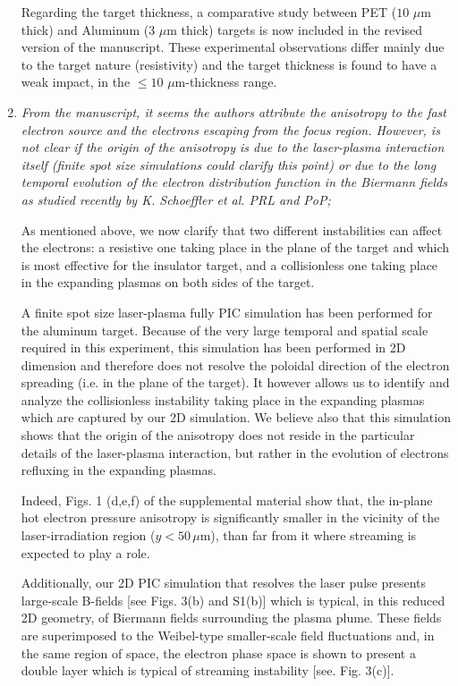 \documentclass[aps,showpacs,superscriptaddress]{revtex4}%
\begin{document}
\begin{enumerate}
Regarding the target thickness, a comparative study between PET ($10$ $\mu$m thick) and Aluminum  (3 $\mu$m thick)  targets is now included in the revised version of the manuscript. These experimental observations differ mainly due to the target nature (resistivity) and the target thickness is found to have a weak impact, in the $\le 10$  $\mu$m-thickness range.

\item \textit{From the manuscript, it seems the authors attribute the anisotropy to the fast electron source and the electrons escaping from the focus region. However, is not clear if the origin of the anisotropy is due to the laser-plasma interaction itself (finite spot size simulations could clarify this point) or due to the long temporal evolution of the electron distribution function in the Biermann fields as studied recently by K. Schoeffler et al. PRL and PoP;}

As mentioned above, we now clarify that two different instabilities can affect the electrons: a resistive one taking place in the plane of the target and which is most effective for the insulator target, and a collisionless one taking place in the expanding plasmas on both sides of the target.

A finite spot size laser-plasma fully  PIC simulation has been performed for the aluminum target. 
Because of the very large temporal and spatial scale required in this experiment, this simulation has been performed in 2D dimension and therefore does not resolve the poloidal direction of the electron spreading (i.e. in the plane of the target). It however allows us to identify and analyze the collisionless instability taking place in the expanding plasmas which are captured by our  2D simulation.
We believe also that this simulation shows that the origin of the anisotropy does not reside in the particular details of the laser-plasma interaction, but rather in the evolution of electrons refluxing in the expanding plasmas.

Indeed, Figs. 1 (d,e,f) of the supplemental material show that,  the in-plane hot electron pressure anisotropy is significantly smaller
in the vicinity of the laser-irradiation region ($y<50\, \mu$m),  than far from it where streaming is expected to play a role.

Additionally, our 2D PIC simulation that resolves the laser pulse presents large-scale B-fields   [see Figs. 3(b) and S1(b)] which is typical, in this reduced 2D geometry, of Biermann fields surrounding the plasma plume.
These fields are superimposed to the Weibel-type smaller-scale field fluctuations  and, in the same region of space, the electron phase space is shown to present a double layer which is typical of streaming instability [see. Fig. 3(c)].  


\end{enumerate}
\end{document}
